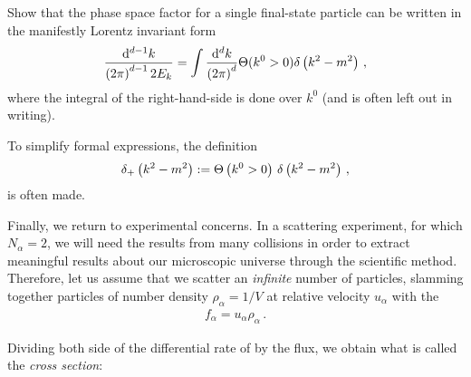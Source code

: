 \begin{exercise}
    \label{ex:lorentz-invariant-phase-space}

    Show that the phase space factor for a single final-state particle can be written in the manifestly Lorentz invariant form
    \begin{align}
        \frac{\dd^{d-1} k}{\left(2\pi\right)^{d-1} 2 E_k}
        =
        \int
        \frac{\dd^d k}{\left(2\pi\right)^d}
        \Theta(k^0 > 0) \delta\left(k^2 - m^2\right)
        \,,
    \end{align}
    where the integral of the right-hand-side is done over \(k^0\) (and is often left out in writing).

    To simplify formal expressions, the definition
    \begin{align}
        \delta_+\left(k^2 - m^2\right)
        :=
        \Theta\left(k^0 > 0\right)\,\delta\left(k^2 - m^2\right)
        \,,
    \end{align}
    is often made.
\end{exercise}


Finally, we return to experimental concerns.
%
In a scattering experiment, for which \(N_\alpha = 2\), we will need the results from many collisions in order to extract meaningful results about our microscopic universe through the scientific method.
%
Therefore, let us assume that we scatter an \textit{infinite} number of particles, slamming together particles of number density \(\rho_\alpha = 1/V\) at relative velocity \(u_{\alpha}\) with the 
\begin{align}
    f_\alpha = u_\alpha \rho_\alpha
    \,.
\end{align}

Dividing both side of the differential rate of  by the flux, we obtain what is called the \textit{cross section}:

